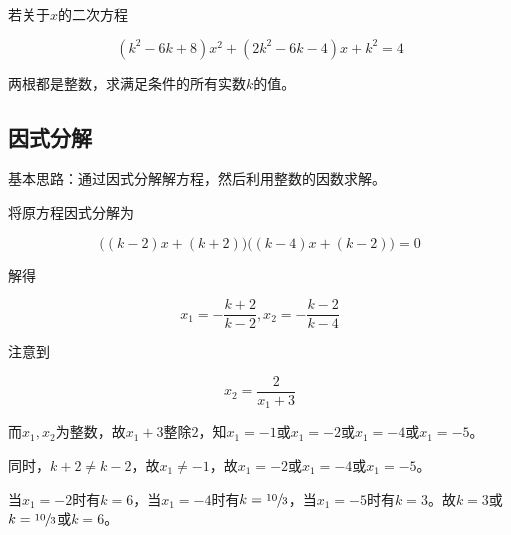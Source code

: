 

若关于$x$的二次方程

\[ (k^2 - 6k + 8)x^2 + (2k^2 - 6k - 4)x + k^2 = 4 \]

两根都是整数，求满足条件的所有实数$k$的值。


\subsection{因式分解}

基本思路：通过因式分解解方程，然后利用整数的因数求解。

将原方程因式分解为

\[ \big((k - 2)x + (k + 2)\big)\big((k - 4)x + (k - 2)\big) = 0 \]

解得

\[ x_1 = -\frac{k + 2}{k - 2}, x_2 = -\frac{k - 2}{k - 4} \]

注意到

\[ x_2 = \frac2{x_1 + 3} \]

而$x_1, x_2$为整数，故$x_1 + 3$整除$2$，知$x_1 = -1$或$x_1 = -2$或$x_1 = -4$或$x_1 = -5$。

同时，$k + 2 \ne k - 2$，故$x_1 \ne-1$，故$x_1 = -2$或$x_1 = -4$或$x_1 = -5$。

当$x_1 = -2$时有$k = 6$，当$x_1 = -4$时有$k = \sfrac{10}3$，当$x_1 = -5$时有$k = 3$。故$k = 3$或$k = \sfrac{10}3$或$k = 6$。
